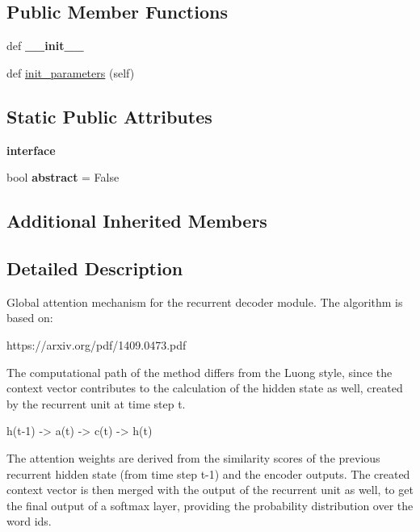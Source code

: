 \subsection*{Public Member Functions}
\begin{DoxyCompactItemize}
\item 
def {\bfseries \+\_\+\+\_\+init\+\_\+\+\_\+}\hypertarget{classrnn_1_1BahdanauAttentionRNNDecoder_a0c718fa50c4707dc06ed5612aec9ae8a}{}\label{classrnn_1_1BahdanauAttentionRNNDecoder_a0c718fa50c4707dc06ed5612aec9ae8a}

\item 
def \hyperlink{classrnn_1_1BahdanauAttentionRNNDecoder_af01d308f26b7f7ae728c1df16cbe574a}{init\+\_\+parameters} (self)
\end{DoxyCompactItemize}
\subsection*{Static Public Attributes}
\begin{DoxyCompactItemize}
\item 
{\bfseries interface}
\item 
bool {\bfseries abstract} = False\hypertarget{classrnn_1_1BahdanauAttentionRNNDecoder_addf7d4bd064d2f44da26829091293820}{}\label{classrnn_1_1BahdanauAttentionRNNDecoder_addf7d4bd064d2f44da26829091293820}

\end{DoxyCompactItemize}
\subsection*{Additional Inherited Members}


\subsection{Detailed Description}
\begin{DoxyVerb}Global attention mechanism for the recurrent decoder module. The algorithm is based on:

    https://arxiv.org/pdf/1409.0473.pdf

The computational path of the method differs from the Luong style, since
the context vector contributes to the calculation of the hidden state as well, created
by the recurrent unit at time step t.

    h(t-1) -> a(t) -> c(t) -> h(t)

The attention weights are derived from the similarity scores of the previous recurrent hidden
state (from time step t-1) and the encoder outputs. The created context vector is then merged with
the output of the recurrent unit as well, to get the final output of a softmax layer, providing the
probability distribution over the word ids.
\end{DoxyVerb}
 

